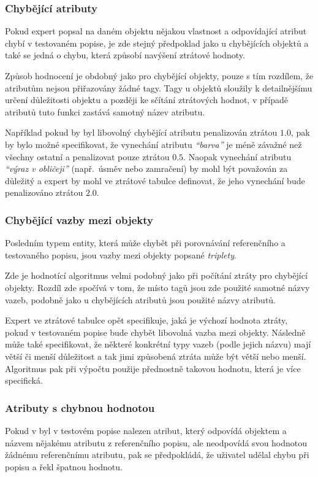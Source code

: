 \subsubsection{Chybějící atributy}
Pokud expert popsal na daném objektu nějakou vlastnost a odpovídající atribut chybí v testovaném popise,
je zde stejný předpoklad jako u chybějících objektů a také se jedná o chybu, která způsobí navýšení ztrátové hodnoty.

Způsob hodnocení je obdobný jako pro chybějící objekty, pouze s tím rozdílem, že atributům nejsou přiřazovány žádné tagy.
Tagy u objektů sloužily k detailnějšímu určení důležitosti objektu a později ke sčítání ztrátových hodnot,
v případě atributů tuto funkci zastává samotný název atributu.

Například pokud by byl libovolný chybějící atributu penalizován ztrátou $1.0$, pak by bylo možné
specifikovat, že vynechání atributu \emph{\enquote{barva}} je méně závažné než všechny ostatní a penalizovat pouze ztrátou $0.5$.
Naopak vynechání atributu \emph{\enquote{výraz v obličeji}} (např.~úsměv nebo zamračení) by mohl být považován za důležitý a expert by
mohl ve ztrátové tabulce definovat, že jeho vynechání bude penalizováno ztrátou $2.0$.

\subsubsection{Chybějící vazby mezi objekty}
Posledním typem entity, která může chybět při porovnávání referenčního a testovaného popisu, jsou vazby mezi objekty popsané \emph{triplety}.

Zde je hodnotící algoritmus velmi podobný jako při počítání ztráty pro chybějící objekty.
Rozdíl zde spočívá v tom, že místo tagů jsou zde použité samotné názvy vazeb, podobně jako u chybějících atributů jsou použité názvy atributů.

Expert ve ztrátové tabulce opět specifikuje, jaká je výchozí hodnota ztráty, pokud v testovaném popise bude chybět libovolná vazba mezi objekty.
Následně může také specifikovat, že některé konkrétní typy vazeb (podle jejich názvu) mají větší či menší důležitost a tak jimi způsobená ztráta může být větší nebo menší.
Algoritmus pak při výpočtu použije přednostně takovou hodnotu, která je více specifická.

\subsubsection{Atributy s chybnou hodnotou}
Pokud v byl v testovém popise nalezen atribut, který odpovídá objektem a názvem nějakému atributu z referenčního popisu,
ale neodpovídá svou hodnotou žádnému referenčnímu atributu, pak se předpokládá, že uživatel udělal chybu při popisu a řekl špatnou hodnotu.

